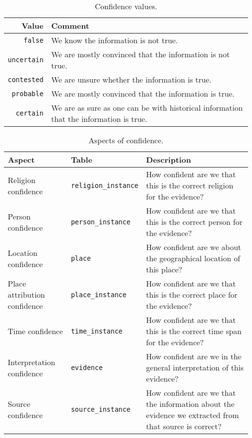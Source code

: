 \begin{table}[htb]
  \centering
  \caption{Confidence values.}
  \label{table:confidence-values}
  \begin{tabular}{@{}rl@{}}
    \toprule
    Value & Comment \\
    \midrule
    \verb!false! & We know the information is not true. \\
    \verb!uncertain! & We are mostly convinced that the information is not true. \\
    \verb!contested! & We are unsure whether the information is true. \\
    \verb!probable! & We are mostly convinced that the information is true. \\
    \verb!certain! & We are as sure as one can be with historical information that the information is true. \\
    \bottomrule
  \end{tabular}
\end{table}

\begin{table}[htb]
  \centering
  \caption{Aspects of confidence.}
  \label{table:confidence-aspects}
  \begin{tabular}{@{}llp{8.5cm}@{}}
    \toprule
    Aspect & Table & Description \\
    \midrule
    Religion confidence & \verb!religion_instance! & How confident are we that this is the correct religion for the evidence? \\
    Person confidence & \verb!person_instance! & How confident are we that this is the correct person for the evidence? \\
    Location confidence & \verb!place! & How confident are we about the geographical location of this place? \\
    Place attribution confidence & \verb!place_instance! & How confident are we that this is the correct place for the evidence? \\
    Time confidence & \verb!time_instance! & How confident are we that this is the correct time span for the evidence? \\
    Interpretation confidence & \verb!evidence! & How confident are we in the general interpretation of this evidence? \\
    Source confidence & \verb!source_instance! & How confident are we that the information about the evidence we extracted from that source is correct? \\
    \bottomrule
  \end{tabular}
\end{table}

